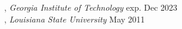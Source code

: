 
, \textit{Georgia Institute of Technology}	\hfill exp. Dec 2023 \\
, \textit{Louisiana State University} \hfill	May 2011 \\

